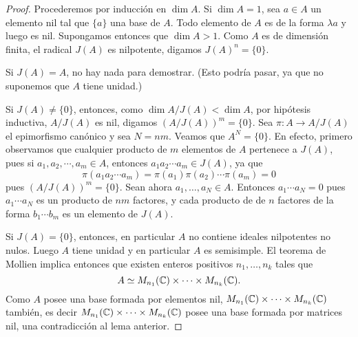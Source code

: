 \begin{proof}
%
	Procederemos por inducción en $\dim A$. Si $\dim A=1$, sea $a\in A$ un
	elemento nil tal que $\{a\}$ una base de $A$. Todo elemento de $A$ es de la
	forma $\lambda a$ y luego es nil.  Supongamos entonces que $\dim A>1$. Como
	$A$ es de dimensión finita, el radical
	$J(A)$ es nilpotente, digamos $J(A)^n=\{0\}$. 
	
	Si $J(A)=A$, no hay nada para
	demostrar. (Esto podría pasar, ya que no suponemos que $A$ tiene unidad.)
	
	Si $J(A)\ne\{0\}$, entonces, como $\dim A/J(A)<\dim A$, por
	hipótesis inductiva, $A/J(A)$ es nil, digamos $(A/J(A))^m=\{0\}$. 
	Sea $\pi\colon A\to A/J(A)$ el epimorfismo 
	canónico y sea $N=nm$. Veamos que $A^N=\{0\}$. En efecto, primero observamos que 
	cualquier producto de $m$ elementos de $A$ pertenece a $J(A)$, pues 
	si $a_1,a_2,\cdots, a_m\in A$, entonces $a_1a_2\cdots a_m\in J(A)$, 
	ya que 
	\[
	\pi(a_1a_2\cdots a_m)=\pi(a_1)\pi(a_2)\cdots \pi(a_m)=0
	\]
	pues $(A/J(A))^m=\{0\}$. Sean ahora $a_1,\dots,a_N\in A$. Entonces $a_1\cdots a_N=0$ 
	pues $a_1\cdots a_N$ es un producto de $nm$ factores, y cada producto de 
	de $n$ factores de la forma $b_1\cdots b_m$ es un elemento de $J(A)$. 
	
	Si $J(A)=\{0\}$, entonces, en particular $A$ no contiene ideales nilpotentes no nulos. 
	Luego $A$ tiene unidad y en particular $A$ es semisimple. 
	El teorema de Mollien implica entonces 
	que existen enteros positivos $n_1,\dots,n_k$ tales que 
	\[
	A\simeq M_{n_1}(\mathbb{C})\times\cdots\times M_{n_k}(\mathbb{C}).
	\]
	Como $A$ posee una base formada
	por elementos nil, $M_{n_1}(\mathbb{C})\times\cdots\times M_{n_k}(\mathbb{C})$
	también, 
	es decir $M_{n_1}(\mathbb{C})\times\cdots\times M_{n_k}(\mathbb{C})$ posee una base formada por matrices nil, 
	una contradicción al lema anterior.
%	
\end{proof}


